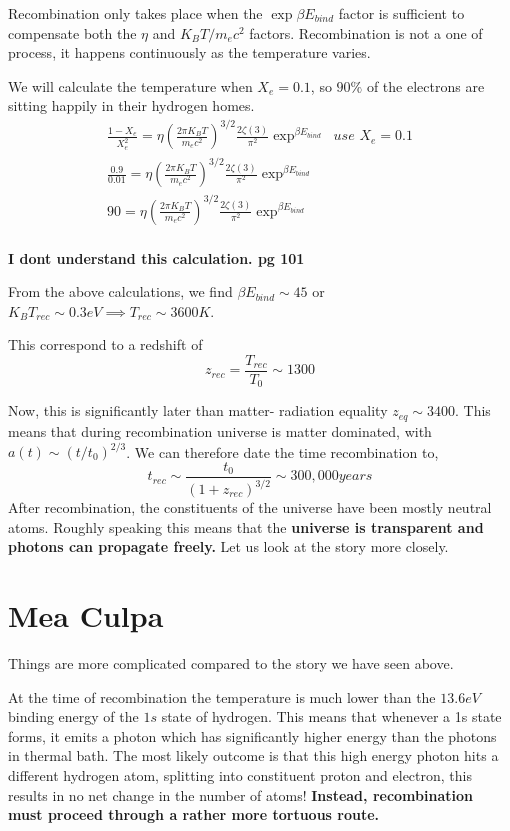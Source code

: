 \documentclass[12pt]{report}
\newcommand{\tbf}[1]{\textbf{#1}}
\newcommand{\tit}[1]{\textit{#1}}
\begin{document}
Recombination only takes place when the $\exp{\beta E_{bind}}$ factor is sufficient to compensate both the $\eta$ and $K_BT/m_ec^2$ factors. Recombination is not a one of process, it happens continuously as the temperature varies. 

We will calculate the temperature when $X_e=0.1$, so $90\%$ of the electrons  are sitting happily in their hydrogen homes. 
\begin{eqnarray}
\frac{1-X_e}{X_e^2}=\eta \left(\frac{2 \pi K_BT}{m_e c^2}\right)^{3/2}  \frac{2\zeta(3)}{\pi^2 } \exp^{\beta E_{bind}}\; \; \tit{use $X_e=0.1$}\\
\frac{0.9}{0.01}=\eta \left(\frac{2 \pi K_BT}{m_e c^2}\right)^{3/2}  \frac{2\zeta(3)}{\pi^2 } \exp^{\beta E_{bind}}\\
90=\eta \left(\frac{2 \pi K_BT}{m_e c^2}\right)^{3/2}  \frac{2\zeta(3)}{\pi^2 } \exp^{\beta E_{bind}}\\
\end{eqnarray}

\tbf{I dont understand this calculation. pg 101}

From the above calculations, we find $\beta E_{bind} \sim 45$ or $K_BT_{rec} \sim 0.3 eV \implies T_{rec}\sim 3600K$.

This correspond to a redshift of 
\begin{equation}
z_{rec}=\frac{T_{rec}}{T_0} \sim 1300
\end{equation}

Now, this is significantly later than matter- radiation equality $z_{eq} \sim 3400$. This means that during recombination universe is matter dominated, with $a(t) \sim (t/t_0)^{2/3}$. We can therefore date the time recombination to,
\begin{equation}
t_{rec} \sim \frac{t_0}{(1+z_{rec})^{3/2}} \sim 300,000 \tit{years}
\end{equation}
After recombination, the constituents of the universe have been mostly neutral atoms. Roughly speaking this means that the \tbf{universe is transparent and photons can propagate freely.} Let us look at the story more closely.

\section*{Mea Culpa}
Things are more complicated compared to the story we have seen above.

At the time of recombination the temperature is much lower than the $13.6eV$ binding energy of the $1s$ state of hydrogen. This means that whenever a 1s state forms, it emits a photon which has significantly higher energy than the photons in thermal bath. The most likely outcome is that this high energy photon hits a different hydrogen atom, splitting into constituent proton and electron, this results in no net change in the number of atoms! \tbf{Instead, recombination must proceed through a rather more tortuous route.}
\end{document}
